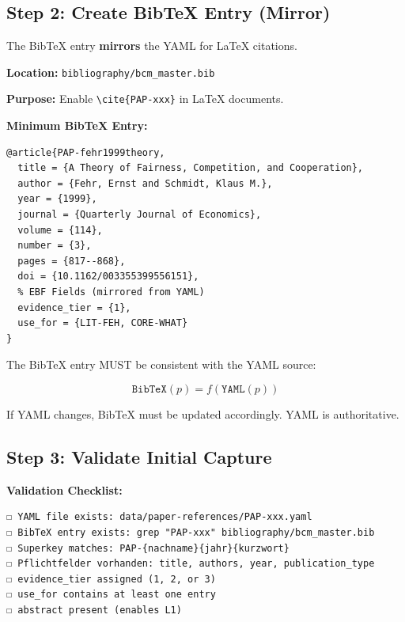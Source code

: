 \subsection{Step 2: Create BibTeX Entry (Mirror)}
\label{sec:ersterfassung-bibtex}

The BibTeX entry \textbf{mirrors} the YAML for LaTeX citations.

\textbf{Location:} \texttt{bibliography/bcm\_master.bib}

\textbf{Purpose:} Enable \texttt{\textbackslash cite\{PAP-xxx\}} in LaTeX documents.

\textbf{Minimum BibTeX Entry:}

\begin{verbatim}
@article{PAP-fehr1999theory,
  title = {A Theory of Fairness, Competition, and Cooperation},
  author = {Fehr, Ernst and Schmidt, Klaus M.},
  year = {1999},
  journal = {Quarterly Journal of Economics},
  volume = {114},
  number = {3},
  pages = {817--868},
  doi = {10.1162/003355399556151},
  % EBF Fields (mirrored from YAML)
  evidence_tier = {1},
  use_for = {LIT-FEH, CORE-WHAT}
}
\end{verbatim}

\begin{tcolorbox}[colback=green!5!white, colframe=green!75!black,
    title=\textbf{Axiom ERST-2: YAML-BibTeX Consistency}]

The BibTeX entry MUST be consistent with the YAML source:

\begin{equation}
\texttt{BibTeX}(p) = f(\texttt{YAML}(p))
\end{equation}

If YAML changes, BibTeX must be updated accordingly. YAML is authoritative.

\end{tcolorbox}

\subsection{Step 3: Validate Initial Capture}
\label{sec:ersterfassung-validate}

\textbf{Validation Checklist:}

\begin{verbatim}
☐ YAML file exists: data/paper-references/PAP-xxx.yaml
☐ BibTeX entry exists: grep "PAP-xxx" bibliography/bcm_master.bib
☐ Superkey matches: PAP-{nachname}{jahr}{kurzwort}
☐ Pflichtfelder vorhanden: title, authors, year, publication_type
☐ evidence_tier assigned (1, 2, or 3)
☐ use_for contains at least one entry
☐ abstract present (enables L1)
\end{verbatim}

